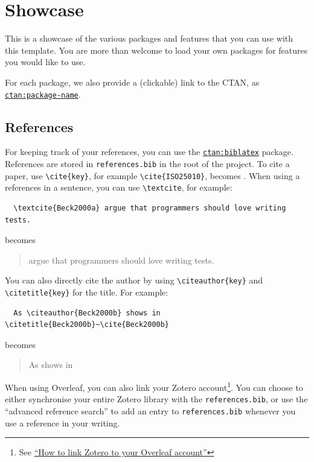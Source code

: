 \chapter{Showcase}%
\label{ch:showcase}

\newcommand{\ctan}[1]{\href{http://ctan.org/pkg/#1}{\texttt{ctan:#1}}}

This is a showcase of the various packages and features that you can use with this template.
You are more than welcome to load your own packages for features you would like to use.

For each package, we also provide a (clickable) link to the \ac{CTAN}, as \ctan{package-name}.

\section{References}
For keeping track of your references, you can use the \ctan{biblatex} package.
References are stored in \verb|references.bib| in the root of the project.
To cite a paper, use \verb|\cite{key}|, for example \verb|\cite{ISO25010}|, becomes \cite{ISO25010}.
When using a references in a sentence, you can use \verb|\textcite|, for example:
\begin{verbatim}
  \textcite{Beck2000a} argue that programmers should love writing tests.
\end{verbatim}
becomes
\begin{quote}
  \textcite{Beck2000a} argue that programmers should love writing tests.
\end{quote}
You can also directly cite the author by using \verb|\citeauthor{key}| and \verb|\citetitle{key}| for the title. For example:
\begin{verbatim}
  As \citeauthor{Beck2000b} shows in \citetitle{Beck2000b}~\cite{Beck2000b}
\end{verbatim}
becomes
\begin{quote}
    As \citeauthor{Beck2000b} shows in ~\cite{Beck2000b}
\end{quote}

When using Overleaf, you can also link your Zotero account\footnote{See \href{https://www.overleaf.com/learn/how-to/How_to_link_Zotero_to_your_Overleaf_account}{``How to link Zotero to your Overleaf account''}}.
You can choose to either synchronise your entire Zotero library with the \verb|references.bib|, or use the ``advanced reference search'' to add an entry to \verb|references.bib| whenever you use a reference in your writing.

